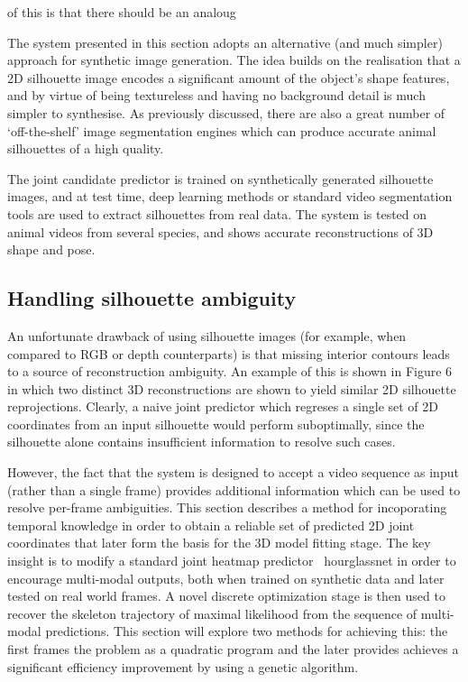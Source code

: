     
    of this is that there should be an analoug%
    
    The system presented in this section adopts an alternative (and much simpler) approach for synthetic image generation. The idea builds on the realisation that a 2D silhouette image encodes a significant amount of the object's shape features, and by virtue of being textureless and having no background detail is much simpler to synthesise. As previously discussed, there are also a great number of `off-the-shelf' image segmentation engines which can produce accurate animal silhouettes of a high quality. 

    The joint candidate predictor is trained on synthetically generated silhouette images, and at test time, deep learning methods or standard video segmentation tools are used to extract silhouettes from real data. The system is tested on animal videos from several species, and shows accurate reconstructions of 3D shape and pose.


\subsection{Handling silhouette ambiguity}

    An unfortunate drawback of using silhouette images (for example, when compared to RGB or depth counterparts) is that missing interior contours leads to a source of reconstruction ambiguity. An example of this is shown in Figure 6 in which two distinct 3D reconstructions are shown to yield similar 2D silhouette reprojections. Clearly, a naive joint predictor which regreses a single set of 2D coordinates from an input silhouette would perform suboptimally, since the silhouette alone contains insufficient information to resolve such cases. 

    However, the fact that the system is designed to accept a video sequence as input (rather than a single frame) provides additional information which can be used to resolve per-frame ambiguities. This section describes a method for incoporating temporal knowledge in order to obtain a reliable set of predicted 2D joint coordinates that later form the basis for the 3D model fitting stage. The key insight is to modify a standard joint heatmap predictor~ {hourglassnet} in order to encourage multi-modal outputs, both when trained on synthetic data and later tested on real world frames. A novel discrete optimization stage is then used to recover the skeleton trajectory of maximal likelihood from the sequence of multi-modal predictions. This section will explore two methods for achieving this: the first frames the problem as a quadratic program and the later provides achieves a significant efficiency improvement by using a genetic algorithm. 


